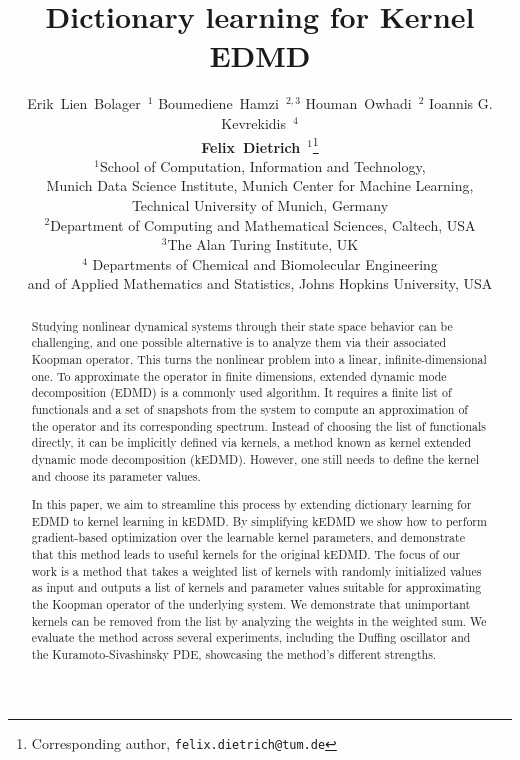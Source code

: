 \documentclass{article}
\title{Dictionary learning for Kernel EDMD}
\author{Erik~Lien~Bolager~\(^{1}\)\hspace{0.4cm} Boumediene~Hamzi~\(^{2,3}\) \hspace{0.4cm} Houman~Owhadi~\(^{2}\) \hspace{0.4cm} 
Ioannis G. Kevrekidis~\(^{4}\)\\  
\textbf{Felix~Dietrich}~\(^{1}\)\thanks{Corresponding author, \texttt{felix.dietrich@tum.de}}\\
	\(^1\)School of Computation, Information and Technology,\\Munich Data Science Institute,  Munich Center for Machine Learning,\\
	Technical University of Munich, Germany \\
    \(^2\)Department of Computing and Mathematical Sciences, Caltech, USA\\
    \(^3\)The Alan Turing Institute, UK\\
    \(^4\) Departments of Chemical and Biomolecular Engineering\\ and of Applied Mathematics and Statistics, Johns Hopkins University, USA
}
\date{}
\begin{document}
\maketitle

\begin{abstract}
Studying nonlinear dynamical systems through their state space behavior can be challenging, and one possible alternative is to analyze them via their associated Koopman operator. This turns the nonlinear problem into a linear, infinite-dimensional one. To approximate the operator in finite dimensions, extended dynamic mode decomposition (EDMD) is a commonly used algorithm. It requires a finite list of functionals and a set of snapshots from the system to compute an approximation of the operator and its corresponding spectrum. Instead of choosing the list of functionals directly, it can be implicitly defined via kernels, a method known as kernel extended dynamic mode decomposition (kEDMD). However, one still needs to define the kernel and choose its parameter values.

In this paper, we aim to streamline this process by extending dictionary learning for EDMD to kernel learning in kEDMD. By simplifying kEDMD we show how to perform gradient-based optimization over the learnable kernel parameters, and demonstrate that this method leads to useful kernels for the original kEDMD. The focus of our work is a method that takes a weighted list of kernels with randomly initialized values as input and outputs a list of kernels and parameter values suitable for approximating the Koopman operator of the underlying system. We demonstrate that unimportant kernels can be removed from the list by analyzing the weights in the weighted sum. We evaluate the method across several experiments, including the Duffing oscillator and the Kuramoto-Sivashinsky PDE, showcasing the method's different strengths.
\end{abstract}
\end{document}
